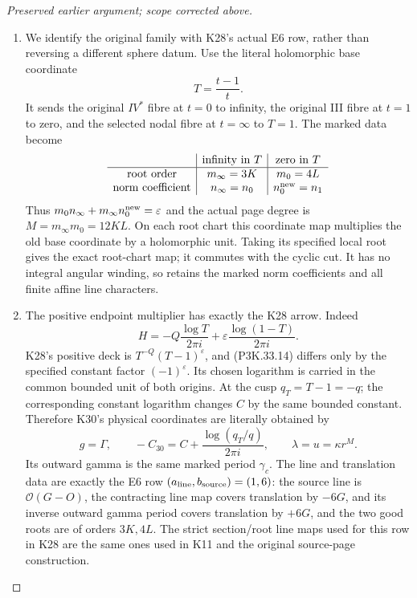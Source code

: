 \begin{proof}[Preserved earlier argument; scope corrected above]
\begin{enumerate}[label=\arabic*.]
\par\medskip\noindent\textbf{4. The signed original-family dictionary and its normal pair.}\enspace

\item We identify the original family with K28's actual E6 row, rather
than reversing a different sphere datum. Use the literal holomorphic
base coordinate
\[
             T=\frac{t-1}{t}.
\]
It sends the original \(IV^*\) fibre at \(t=0\) to infinity,
the original III fibre at \(t=1\) to zero, and the selected nodal
fibre at \(t=\infty\) to \(T=1\). The marked data become
\[
\begin{array}{c|c|c}
 &\text{infinity in }T&\text{zero in }T\\\hline
 \text{root order}&m_\infty=3K&m_0=4L\\
 \text{norm coefficient}&n_\infty=n_0&n_0^{\rm new}=n_1
\end{array}
\]
Thus \(m_0n_\infty+m_\infty n_0^{\rm new}=\varepsilon\)
and the actual page degree is \(M=m_\infty m_0=12KL\).
On each root chart this coordinate map multiplies the old base
coordinate by a holomorphic unit. Taking its specified local root
gives the exact root-chart map; it commutes with the cyclic cut.
It has no integral angular winding, so retains the marked norm
coefficients and all finite affine line characters.

\item The positive endpoint multiplier has exactly the K28 arrow. Indeed
\[
 H=-Q\frac{\log T}{2\pi i}
       +\varepsilon\frac{\log(1-T)}{2\pi i}.
                                                               \tag{P3K.33.14}
\]
K28's positive deck is
\(T^{-Q}(T-1)^{\varepsilon}\), and (P3K.33.14) differs only by
the specified constant factor \((-1)^{\varepsilon}\). Its chosen
logarithm is carried in the common bounded unit of both origins.
At the cusp \(q_T=T-1=-q\); the corresponding constant logarithm
changes \(C\) by the same bounded constant. Therefore K30's
physical coordinates are literally obtained by
\[
 g=\Gamma,\qquad -C_{30}=C+\frac{\log(q_T/q)}{2\pi i},
 \qquad \lambda=u=\kappa r^M.
\]
Its outward gamma is the same marked period \(\gamma_c\).
The line and translation data are exactly the E6 row
\((a_{\rm line},b_{\rm source})=(1,6)\): the source line is
\(\mathcal O(G-O)\), the contracting line map covers
translation by \(-6G\), and its inverse outward gamma period
covers translation by \(+6G\),
and the two good roots are of orders \(3K,4L\). The strict
section/root line maps used for this row in K28 are the same
ones used in K11 and the original source-page construction.


\end{enumerate}
\end{proof}
